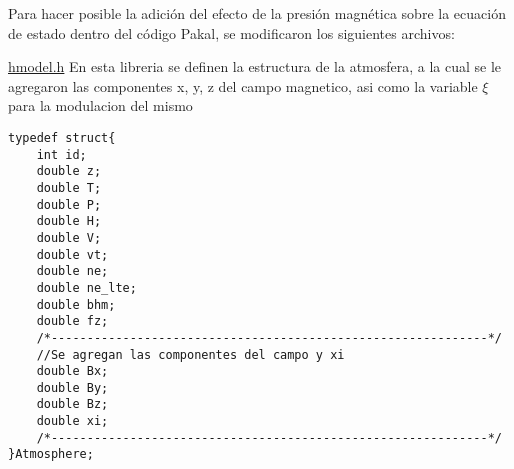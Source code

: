 Para hacer posible la adici\'on del efecto de la presi\'on magn\'etica sobre la ecuaci\'on de estado dentro del c\'odigo Pakal, se modificaron los siguientes archivos:\newline

\underline{hmodel.h}
En esta libreria se definen la estructura de la atmosfera, a la cual se le agregaron las componentes x, y, z del campo magnetico, asi como la variable $\xi$ para la modulacion del mismo
\begin{lstlisting}[style=CStyle]
typedef struct{
	int id;
	double z;
	double T;
	double P;
	double H;
	double V;
	double vt;
	double ne;
	double ne_lte;
	double bhm;
	double fz;
	/*-------------------------------------------------------------*/
	//Se agregan las componentes del campo y xi
	double Bx;
	double By;
	double Bz;
	double xi;
	/*-------------------------------------------------------------*/	
}Atmosphere;

\end{lstlisting}

